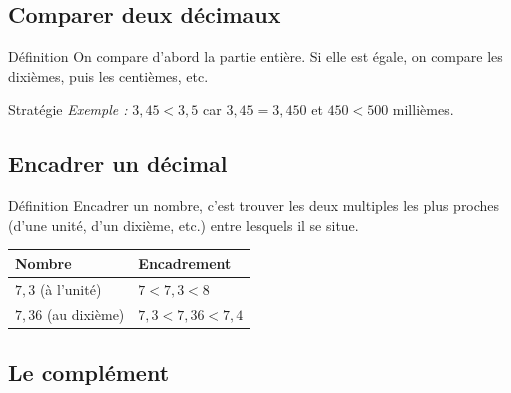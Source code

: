 \vspace{10pt}
\subsection{Comparer deux décimaux}

\begin{regle}{Définition}
On compare d'abord la partie entière. Si elle est égale, on compare les dixièmes, puis les centièmes, etc.
\end{regle}

\vspace{6pt}
\begin{astuce}{Stratégie}
\textit{Exemple :} $3,45 < 3,5$ car $3,45 = 3,450$ et $450 < 500$ millièmes.
\end{astuce}

\vspace{10pt}
\subsection{Encadrer un décimal}

\begin{regle}{Définition}
Encadrer un nombre, c'est trouver les deux multiples les plus proches (d'une unité, d'un dixième, etc.) entre lesquels il se situe.
\end{regle}

\vspace{6pt}
\def\arraystretch{1.2}
\begin{tabularx}{\linewidth}{|X|X|}
\hline
\cellcolor{themeNO!30}\textbf{Nombre} & \cellcolor{themeNO!30}\textbf{Encadrement} \\\hline
$7,3$ (à l'unité) & $7 < 7,3 < 8$ \\\hline
$7,36$ (au dixième) & $7,3 < 7,36 < 7,4$ \\\hline
\end{tabularx}
\def\arraystretch{1}

\newpage
\semaineinvisible
{} 

\vfill
\subsection{Le complément}

